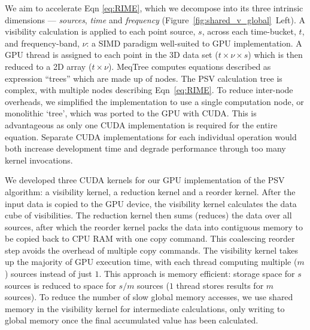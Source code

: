 We aim to accelerate Eqn \ref{eq:RIME}, which we  decompose into its three intrinsic dimensions --- \emph{sources}, \emph{time} and \emph{frequency} (Figure~\ref{fig:shared_v_global}~Left). A visibility calculation is applied to each point source, $s$, across each time-bucket, $t$, and frequency-band, $\nu$: a SIMD paradigm well-suited to GPU implementation.  A GPU thread is assigned to each point in the 3D data set ($t\times \nu \times s$) which is then reduced to a 2D array ($t\times \nu$). MeqTree computes equations described as expression ``trees'' which are made up of nodes. The PSV calculation tree is complex,  with multiple nodes  describing Eqn~\ref{eq:RIME}.  To reduce inter-node overheads, we simplified the implementation to use a single computation node, or monolithic `tree', which was ported to the GPU with CUDA. This is advantageous as only one CUDA implementation is required for the entire equation. Separate CUDA implementations for each individual operation would both increase development time and degrade performance through too many kernel invocations.

We developed three CUDA kernels for our GPU implementation of the PSV algorithm: a visibility kernel, a reduction kernel and a reorder kernel. After the input data is copied to the GPU device, the visibility kernel calculates the data cube of visibilities.  The reduction kernel then sums (reduces) the data over all sources, after which the reorder kernel packs the data into contiguous memory to be copied back to CPU RAM with one copy command. This coalescing reorder step avoids the overhead of multiple copy commands. The visibility kernel takes up the majority of GPU execution time, with each thread computing multiple ($m$) sources instead of just $1$. This approach is memory efficient: storage space for $s$ sources is reduced to space for $s/m$ sources ($1$ thread stores results for $m$ sources). To reduce the number of slow global memory accesses, we use shared memory in the visibility kernel for intermediate calculations, only writing to global memory once the final accumulated value has been calculated.

